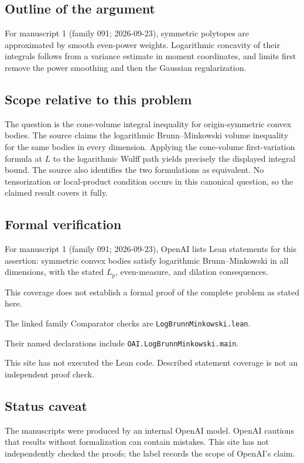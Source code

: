 \documentclass[11pt]{article}
\begin{document}
\subsection{Outline of the argument}
For manuscript 1 (family 091; 2026-09-23), symmetric polytopes are approximated by smooth even-power weights. Logarithmic concavity of their integrals follows from a variance estimate in moment coordinates, and limits first remove the power smoothing and then the Gaussian regularization.

\subsection{Scope relative to this problem}
The question is the cone-volume integral inequality for origin-symmetric convex bodies. The source claims the logarithmic Brunn--Minkowski volume inequality for the same bodies in every dimension. Applying the cone-volume first-variation formula at $L$ to the logarithmic Wulff path yields precisely the displayed integral bound. The source also identifies the two formulations as equivalent. No tensorization or local-product condition occurs in this canonical question, so the claimed result covers it fully.

\subsection{Formal verification}
For manuscript 1 (family 091; 2026-09-23), OpenAI lists Lean statements for this assertion: symmetric convex bodies satisfy logarithmic Brunn--Minkowski in all dimensions, with the stated $L_p$, even-measure, and dilation consequences.

This coverage does not establish a formal proof of the complete problem as stated here.

The linked family Comparator checks are \texttt{LogBrunnMinkowski.lean}.

Their named declarations include \texttt{OAI.LogBrunnMinkowski.main}.

This site has not executed the Lean code. Described statement coverage is not an independent proof check.

\subsection{Status caveat}
The manuscripts were produced by an internal OpenAI model. OpenAI cautions that results without formalization can contain mistakes. This site has not independently checked the proofs; the label records the scope of OpenAI's claim.
\end{document}

